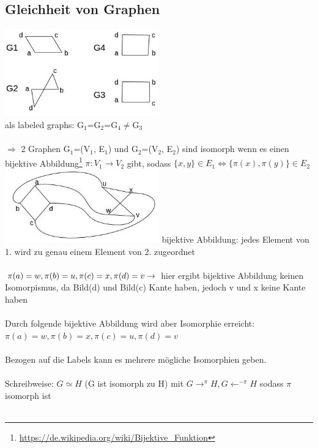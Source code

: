 \subsection{Gleichheit von Graphen}
\includegraphics[width=0.5\textwidth]{lectures/161014/pix/5.jpg}\\
als labeled graphs: G$_1$=G$_2$=G$_4\neq$G$_3$\\\\
$\Rightarrow$ 2 Graphen G$_1$=(V$_1$, E$_1$) und G$_2$=(V$_2$, E$_2$) sind isomorph wenn es einen bijektive Abbildung\footnote{\url{https://de.wikipedia.org/wiki/Bijektive_Funktion}} $\pi:V_1 \rightarrow V_2$ gibt, sodass $\{x,y\} \in E_1 \Leftrightarrow \{\pi(x),\pi(y)\} \in E_2$
\\
\includegraphics[width=0.5\textwidth]{lectures/161014/pix/6.jpg}
bijektive Abbildung: jedes Element von 1. wird zu genau einem Element von 2. zugeordnet\\\\
$\pi(a)=w, \pi(b)=u, \pi(c)=x, \pi(d)=v \\ \rightarrow$ hier ergibt bijektive Abbildung keinen Isomorpismus, da Bild(d) und Bild(c) Kante haben, jedoch v und x keine Kante haben\\\\
Durch folgende bijektive Abbildung wird aber Isomorphie erreicht:\\
$\pi(a)=w, \pi(b)=x, \pi(c)=u, \pi(d)=v$
\\\\
Bezogen auf die Labels kann es mehrere mögliche Isomorphien geben.
\\\\
Schreibweise: $G \simeq H$ (G ist isomorph zu H) mit 
$G\rightarrow^\pi H, G \leftarrow^{-\pi}H$ sodass $\pi$ isomorph ist
\\\\
